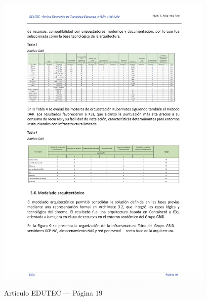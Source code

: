 \begin{figure}[H]
    \centering
    \begin{tcolorbox}[
        colback=white,
        colframe=gray!50,
        boxrule=1pt,
        arc=2pt,
        boxsep=5pt,
        left=3pt,
        right=3pt,
        top=3pt,
        bottom=3pt,
        drop shadow
    ]
        \includegraphics[width=0.95\textwidth,keepaspectratio]{apendices/EDUTEC/19.png}
    \end{tcolorbox}
    \caption{Artículo EDUTEC --- Página 19}\label{fig:edutec-pagina-19}
\end{figure}
\FloatBarrier

